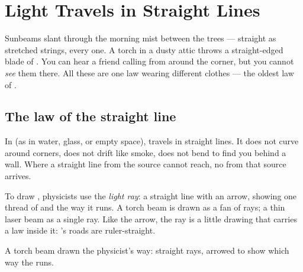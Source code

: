 \chapter{Light Travels in Straight Lines}\label{ch:g4:light-straight-lines}

Sunbeams slant through the morning mist between the trees ---
straight as stretched strings, every one. A torch in a dusty attic
throws a straight-edged blade of . You can hear a friend
calling from around the corner, but you cannot \emph{see} them
there. All these are one law wearing different clothes --- the
oldest law of .

\section{The law of the straight line}

\begin{proposition}\label{prop:g4:light-straight-lines:law}
In  (as in water, glass, or empty space),  travels in
straight lines. It does not curve around corners, does not drift
like smoke, does not bend to find you behind a wall. Where a
straight line from the source cannot reach, no  from that
source arrives.
\end{proposition}

\begin{definition}\label{def:g4:light-straight-lines:ray}
To draw , physicists use the \emph{light ray}: a straight line with an arrow, showing one thread of 
and the way it runs. A torch beam is drawn as a fan of rays; a thin
laser beam as a single ray. Like the  arrow, the ray is a
little drawing that carries a law inside it: 's roads are
ruler-straight.
\end{definition}

\begin{omfigure}

{\small A torch beam drawn the physicist's way: straight rays,
arrowed to show which way the  runs.}
\end{omfigure}

